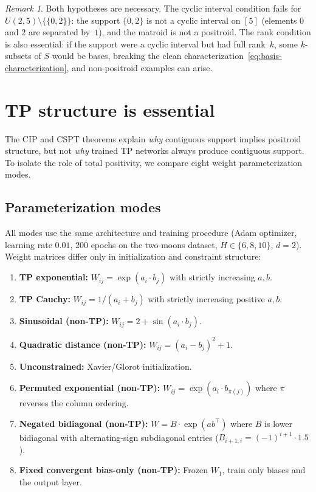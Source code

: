 \documentclass[11pt]{article}
\theoremstyle{definition}
\theoremstyle{remark}
\newtheorem{remark}[theorem]{Remark}
\begin{document}
\begin{remark}\label{rem:hypotheses-necessary}
  Both hypotheses are necessary.  The cyclic interval condition
  fails for $U(2, 5) \setminus \{\{0, 2\}\}$: the support $\{0, 2\}$
  is not a cyclic interval on $[5]$ (elements $0$ and $2$ are
  separated by~$1$), and the matroid is not a positroid.  The rank
  condition is also essential: if the support were a cyclic interval
  but had full rank~$k$, some $k$-subsets of $S$ would be bases,
  breaking the clean characterization~\eqref{eq:basis-characterization},
  and non-positroid examples can arise.
\end{remark}


\section{TP structure is essential}\label{sec:tp-essential}

The CIP and CSPT theorems explain \emph{why} contiguous support
implies positroid structure, but not \emph{why} trained TP networks
always produce contiguous support.  To isolate the role of total
positivity, we compare eight weight parameterization modes.

\subsection{Parameterization modes}\label{sec:param-modes}

All modes use the same architecture and training procedure (Adam
optimizer, learning rate $0.01$, 200 epochs on the two-moons dataset,
$H \in \{6, 8, 10\}$, $d = 2$).  Weight matrices differ only in
initialization and constraint structure:

\begin{enumerate}
  \item \textbf{TP exponential:} $W_{ij} = \exp(a_i \cdot b_j)$
    with strictly increasing $a, b$.
  \item \textbf{TP Cauchy:} $W_{ij} = 1/(a_i + b_j)$ with
    strictly increasing positive $a, b$.
  \item \textbf{Sinusoidal (non-TP):}
    $W_{ij} = 2 + \sin(a_i \cdot b_j)$.
  \item \textbf{Quadratic distance (non-TP):}
    $W_{ij} = (a_i - b_j)^2 + 1$.
  \item \textbf{Unconstrained:} Xavier/Glorot initialization.
  \item \textbf{Permuted exponential (non-TP):}
    $W_{ij} = \exp(a_i \cdot b_{\pi(j)})$ where $\pi$ reverses the
    column ordering.
  \item \textbf{Negated bidiagonal (non-TP):}
    $W = B \cdot \exp(a b^\top)$ where $B$ is lower bidiagonal with
    alternating-sign subdiagonal entries
    ($B_{i+1,i} = (-1)^{i+1} \cdot 1.5$).
  \item \textbf{Fixed convergent bias-only (non-TP):} Frozen $W_1$,
    train only biases and the output layer.
\end{enumerate}
\end{document}
